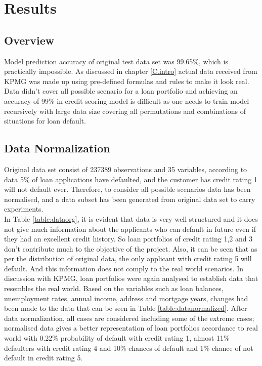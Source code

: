 %
%
%
%

\chapter{Results}\label{C.Results}

\section{Overview}
Model prediction accuracy of original test data set was 99.65\%, which is practically impossible. As discussed in chapter \ref{C.intro} actual data received from KPMG was made up using pre-defined formulas and rules to make it look real. Data didn't cover all possible scenario for a loan portfolio and achieving an accuracy of 99\% in credit scoring model is difficult as one needs to train model recursively with large data size covering all permutations and combinations of situations for loan default.

\section{Data Normalization}\label{S.intro5}

Original data set consist of 237389 observations and 35 variables, according to data 5\% of loan applications have defaulted, and the customer has credit rating 1 will not default ever. Therefore, to consider all possible scenarios data has been normalised, and a data subset has been generated from original data set to carry experiments.\\

In Table \ref{table:dataorg}, it is evident that data is very well structured and it does not give much information about the applicants who can default in future even if they had an excellent credit history. So loan portfolios of credit rating 1,2 and 3 don't contribute much to the objective of the project. Also, it can be seen that as per the distribution of original data, the only applicant with credit rating 5 will default. And this information does not comply to the real world scenarios. In discussion with KPMG, loan portfolios were again analysed to establish data that resembles the real world. Based on the variables such as loan balances, unemployment rates, annual income, address and mortgage years, changes had been made to the data that can be seen in Table \ref{table:datanormalized}. After data normalization, all cases are considered including some of the extreme cases; normalised data gives a better representation of loan portfolios accordance to real world with 0.22\% probability of default with credit rating 1, almost 11\% defaulters with credit rating 4 and 10\% chances of default and 1\% chance of not default in credit rating 5.   

